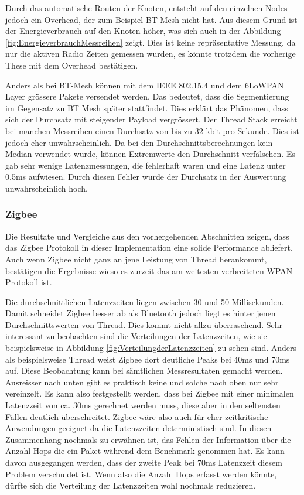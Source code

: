 Durch das automatische Routen der Knoten, entsteht auf den einzelnen Nodes jedoch ein Overhead, der zum Beispiel BT-Mesh nicht hat. Aus diesem Grund ist der Energieverbrauch auf den Knoten höher, was sich auch in der Abbildung \ref{fig:EnergieverbrauchMessreihen} zeigt. Dies ist keine repräsentative Messung, da nur die aktiven Radio Zeiten gemessen wurden, es könnte trotzdem die vorherige These mit dem Overhead bestätigen. 

Anders als bei BT-Mesh können mit dem IEEE 802.15.4 und dem 6LoWPAN Layer grössere Pakete versendet werden. Das bedeutet, dass die Segmentierung im Gegensatz zu BT Mesh später stattfindet. Dies erklärt das Phänomen, dass sich der Durchsatz mit steigender Payload vergrössert. Der Thread Stack erreicht bei manchen Messreihen einen Durchsatz von bis zu 32 kbit pro Sekunde. Dies ist jedoch eher unwahrscheinlich. Da bei den Durchschnittsberechnungen kein Median verwendet wurde, können Extremwerte den Durchschnitt verfälschen. Es gab sehr wenige Latenzmessungen, die fehlerhaft waren und eine Latenz unter 0.5ms aufwiesen. Durch diesen Fehler wurde der Durchsatz in der Auswertung unwahrscheinlich hoch. 

\subsubsection{Zigbee}\label{subsubsec:FazitZigbee}
Die Resultate und Vergleiche aus den vorhergehenden Abschnitten zeigen, dass das Zigbee Protokoll in dieser Implementation eine solide Performance abliefert.
Auch wenn Zigbee nicht ganz an jene Leistung von Thread herankommt, bestätigen die Ergebnisse wieso es zurzeit das am weitesten verbreiteten WPAN Protokoll ist.

Die durchschnittlichen Latenzzeiten liegen zwischen 30 und 50 Millisekunden. Damit schneidet Zigbee besser ab als Bluetooth jedoch liegt es hinter jenen Durchschnittswerten von Thread.
Dies kommt nicht allzu überraschend.
Sehr interessant zu beobachten sind die Verteilungen der Latenzzeiten, wie sie beispielsweise in Abbildung \ref{fig:VerteilungderLatenzzeiten} zu sehen sind.
Anders als beispielsweise Thread weist Zigbee dort deutliche Peaks bei 40ms und 70ms auf.
Diese Beobachtung kann bei sämtlichen Messresultaten gemacht werden.
Ausreisser nach unten gibt es praktisch keine und solche nach oben nur sehr vereinzelt.
Es kann also festgestellt werden, dass bei Zigbee mit einer minimalen Latenzzeit von ca. 30ms gerechnet werden muss, diese aber in den seltensten Fällen deutlich überschreitet.
Zigbee wäre also auch für eher zeitkritische Anwendungen geeignet da die Latenzzeiten deterministisch sind.
In diesen Zusammenhang nochmals zu erwähnen ist, das Fehlen der Information über die Anzahl Hops die ein Paket während dem Benchmark genommen hat.
Es kann davon ausgegangen werden, dass der zweite Peak bei 70ms Latenzzeit diesem Problem verschuldet ist.
Wenn also die Anzahl Hops erfasst werden könnte, dürfte sich die Verteilung der Latenzzeiten wohl nochmals reduzieren.

